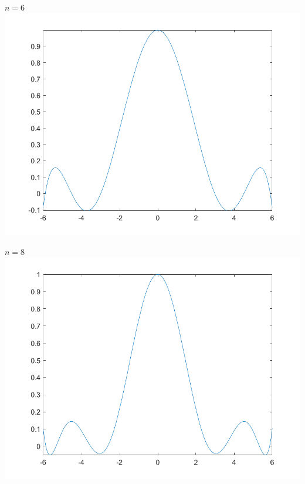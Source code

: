 \vspace{0.2cm}

\begin{center}
	\(n=6\) \\
	\includegraphics[scale=0.55]{cap4/4_7/6.png}
\end{center}

\begin{center}
	\(n=8\) \\
	\includegraphics[scale=0.55]{cap4/4_7/8.png}
\end{center}

